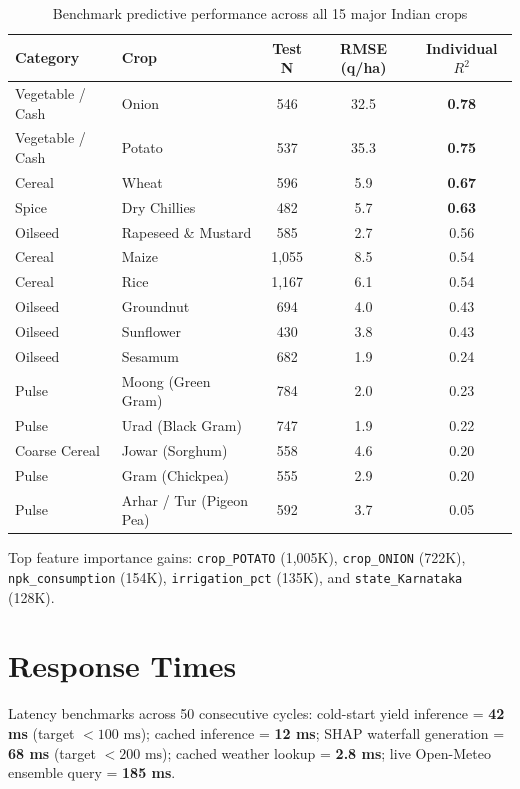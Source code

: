 \documentclass[11pt,a4paper]{report}
\begin{document}
\begin{table}[htbp]
\centering
\small
\caption{Benchmark predictive performance across all 15 major Indian crops}
\begin{tabularx}{\textwidth}{llccc}
\toprule
\textbf{Category} & \textbf{Crop} & \textbf{Test N} & \textbf{RMSE (q/ha)} & \textbf{Individual $R^2$} \\
\midrule
Vegetable / Cash & Onion & 546 & 32.5 & \textbf{0.78} \\
Vegetable / Cash & Potato & 537 & 35.3 & \textbf{0.75} \\
Cereal & Wheat & 596 & 5.9 & \textbf{0.67} \\
Spice & Dry Chillies & 482 & 5.7 & \textbf{0.63} \\
Oilseed & Rapeseed \& Mustard & 585 & 2.7 & 0.56 \\
Cereal & Maize & 1,055 & 8.5 & 0.54 \\
Cereal & Rice & 1,167 & 6.1 & 0.54 \\
Oilseed & Groundnut & 694 & 4.0 & 0.43 \\
Oilseed & Sunflower & 430 & 3.8 & 0.43 \\
Oilseed & Sesamum & 682 & 1.9 & 0.24 \\
Pulse & Moong (Green Gram) & 784 & 2.0 & 0.23 \\
Pulse & Urad (Black Gram) & 747 & 1.9 & 0.22 \\
Coarse Cereal & Jowar (Sorghum) & 558 & 4.6 & 0.20 \\
Pulse & Gram (Chickpea) & 555 & 2.9 & 0.20 \\
Pulse & Arhar / Tur (Pigeon Pea) & 592 & 3.7 & 0.05 \\
\bottomrule
\end{tabularx}
\end{table}

Top feature importance gains: \texttt{crop\_POTATO} (1,005K), \texttt{crop\_ONION} (722K), \texttt{npk\_consumption} (154K), \texttt{irrigation\_pct} (135K), and \texttt{state\_Karnataka} (128K).

\section{Response Times}
Latency benchmarks across 50 consecutive cycles: cold-start yield inference = \textbf{42 ms} (target $< 100\text{ ms}$); cached inference = \textbf{12 ms}; SHAP waterfall generation = \textbf{68 ms} (target $< 200\text{ ms}$); cached weather lookup = \textbf{2.8 ms}; live Open-Meteo ensemble query = \textbf{185 ms}.
\end{document}
